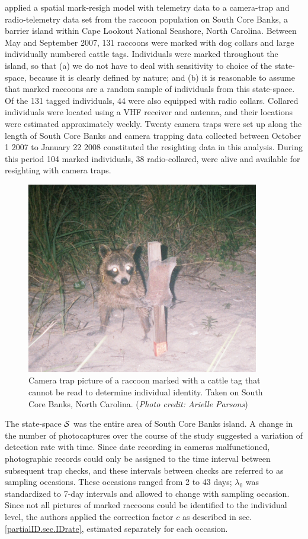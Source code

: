 \citet{sollmann_etal:2012ecol} applied a spatial mark-resigh model with telemetry data to a camera-trap and radio-telemetry data set from the raccoon population on South Core Banks, a barrier island within Cape Lookout National Seashore, North Carolina. Between May and September 2007, 131 raccoons were marked with dog collars and large individually numbered cattle tags. Individuals were marked throughout the island, so that (a) we do not have to deal with sensitivity to choice of the state-space, because it is clearly defined by nature; and (b) it is reasonable to assume that marked raccoons are a random sample of individuals from this state-space.
Of the 131 tagged individuals, 44  were also equipped with radio collars. Collared individuals were located using a VHF receiver and antenna, and their locations were estimated approximately weekly. Twenty camera traps  were set up along the length of South Core Banks and camera trapping data collected between October 1 2007 to January 22 2008 constituted the resighting data in this analysis. During this period 104 marked individuals, 38 radio-collared, were alive and available for resighting with camera traps.

\begin{figure}[ht]
  \centering
  \includegraphics[width=4in]{Ch19-PartialID/figs/Raccoon_pic.png}
  \caption{Camera trap picture of a raccoon marked with a cattle tag that cannot be read to determine individual identity. Taken on South Core Banks, North Carolina.
({\it Photo credit: Arielle Parsons})}
  \label{partialID.fig.raccoon}
\end{figure}

The state-space ${\cal S}$ was the entire area of South Core Banks island. A change in the number of photocaptures over the course of the study suggested a variation of detection rate with time. Since date recording in cameras malfunctioned, photographic records could only be assigned to the time interval between subsequent trap checks, and these intervals between checks are referred to as sampling occasions. These occasions ranged from 2 to 43 days; $\lambda_0$ was standardized to 7-day intervals and allowed to change with sampling occasion. Since not all pictures of marked raccoons could be identified to the individual level, the authors applied the correction factor $c$ as described in sec. \ref{partialID.sec.IDrate}, estimated separately for each occasion.

